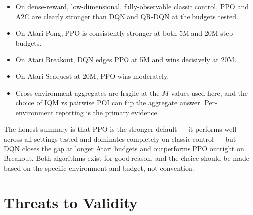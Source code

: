 \begin{itemize}
  \item On dense-reward, low-dimensional, fully-observable classic
  control, PPO and A2C are clearly stronger than DQN and QR-DQN at the
  budgets tested.
  \item On Atari Pong, PPO is consistently stronger at both 5M and 20M
  step budgets.
  \item On Atari Breakout, DQN edges PPO at 5M and wins decisively at
  20M.
  \item On Atari Seaquest at 20M, PPO wins moderately.
  \item Cross-environment aggregates are fragile at the $M$ values used
  here, and the choice of IQM vs pairwise POI can flip the aggregate
  answer. Per-environment reporting is the primary evidence.
\end{itemize}

The honest summary is that PPO is the stronger default --- it performs
well across all settings tested and dominates completely on classic
control --- but DQN closes the gap at longer Atari budgets and
outperforms PPO outright on Breakout. Both algorithms exist for good
reason, and the choice should be made based on the specific environment
and budget, not convention.


{\color{red} \section{Threats to Validity}}


